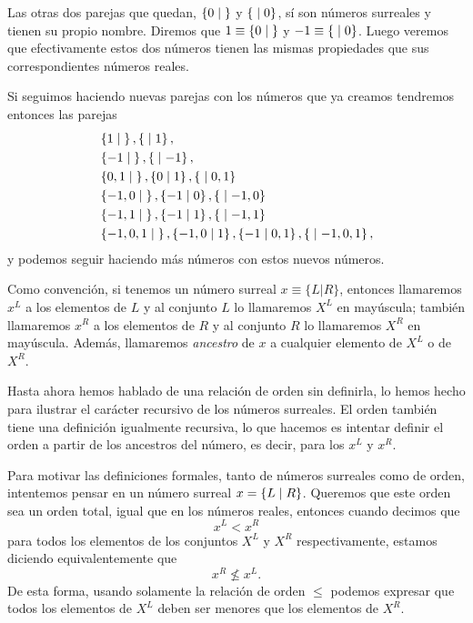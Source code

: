    Las otras dos parejas que quedan, $\left\{0\;\middle|\; \right\}$ y $\left\{\;\middle|\; 0\right\}$, s\'i son n\'umeros surreales y tienen su propio nombre. Diremos que $1 \equiv\left\{0\;\middle|\; \right\}$ y $-1 \equiv\left\{\;\middle|\; 0\right\}$. Luego veremos que efectivamente estos dos n\'umeros tienen las mismas propiedades que sus correspondientes n\'umeros reales.

    Si seguimos haciendo nuevas parejas con los n\'umeros que ya creamos tendremos entonces las parejas
    \begin{align*}
        &\left\{1\;\middle|\; \right\}, \left\{\;\middle|\; 1\right\},\\
        &\left\{-1\;\middle|\; \right\}, \left\{\;\middle|\; -1\right\}, \\
        &\left\{0,1\;\middle|\; \right\}, \left\{0\;\middle|\; 1\right\}, \left\{\;\middle|\; 0,1\right\} \\
        &\left\{-1,0\;\middle|\; \right\}, \left\{-1\;\middle|\; 0\right\}, \left\{\;\middle|\; -1,0\right\} \\
        &\left\{-1,1\;\middle|\; \right\}, \left\{-1\;\middle|\; 1\right\}, \left\{\;\middle|\; -1,1\right\} \\
        &\left\{-1,0,1\;\middle|\; \right\}, \left\{-1,0\;\middle|\; 1\right\}, \left\{-1\;\middle|\; 0,1\right\}, \left\{\;\middle|\; -1,0,1\right\},
    \end{align*}
    y podemos seguir haciendo m\'as n\'umeros con estos nuevos n\'umeros.
    
    Como convención, si tenemos un número surreal $x\equiv\{L|R\}$, entonces llamaremos $x^L$ a los elementos de $L$ y al conjunto $L$ lo llamaremos $X^L$ en may\'uscula; tambi\'en llamaremos $x^R$ a los elementos de $R$ y al conjunto $R$ lo llamaremos $X^R$ en may\'uscula. Adem\'as, llamaremos \textit{ancestro} de $x$ a cualquier elemento de $X^L$ o de $X^R$.

    Hasta ahora hemos hablado de una relaci\'on de orden sin definirla, lo hemos hecho para ilustrar el car\'acter recursivo de los n\'umeros surreales. El orden tambi\'en tiene una definici\'on igualmente recursiva, lo que hacemos es intentar definir el orden a partir de los ancestros del n\'umero, es decir, para los $x^L$ y $x^R$.

    Para motivar las definiciones formales, tanto de n\'umeros surreales como de orden, intentemos pensar en un n\'umero surreal $x = \left\{L\;\middle|\; R\right\}$. Queremos que este orden sea un orden total, igual que en los n\'umeros reales, entonces cuando decimos que
    \[
        x^L < x^R
    \]
    para todos los elementos de los conjuntos $X^L$ y $X^R$ respectivamente, estamos diciendo equivalentemente que
    \[
        x^R \not\le x^L.
    \]
    De esta forma, usando solamente la relaci\'on de orden $\le$ podemos expresar que todos los elementos de $X^L$ deben ser menores que los elementos de $X^R$.

